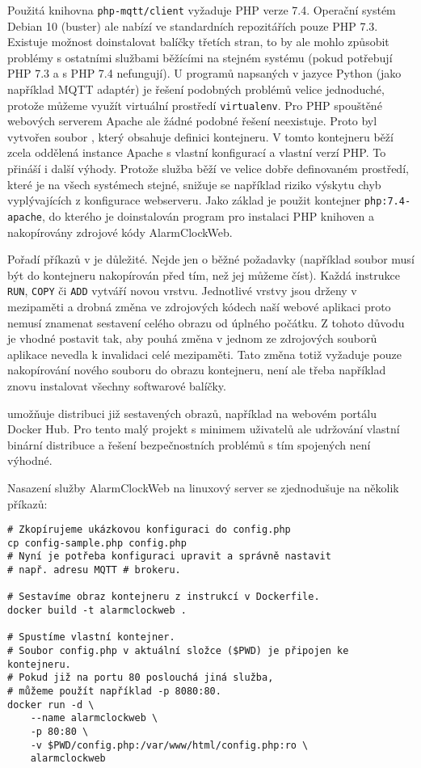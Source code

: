 
Použitá knihovna \texttt{php-mqtt/client} vyžaduje PHP verze 7.4. Operační
systém Debian 10 (buster) ale nabízí ve standardních repozitářích pouze PHP
7.3. Existuje možnost doinstalovat balíčky třetích stran, to by ale mohlo
způsobit problémy s ostatními službami běžícími na stejném systému (pokud
potřebují PHP 7.3 a s PHP 7.4 nefungují).
U programů napsaných v jazyce Python (jako například MQTT adaptér) je řešení
podobných problémů velice jednoduché, protože můžeme využít virtuální prostředí
\texttt{virtualenv}. Pro PHP spouštěné webových serverem Apache ale žádné
podobné řešení neexistuje.
Proto byl vytvořen soubor , který obsahuje definici
kontejneru. V tomto kontejneru běží zcela oddělená instance Apache s vlastní
konfigurací a vlastní verzí PHP. To přináší i další výhody. Protože služba běží
ve velice dobře definovaném prostředí, které je na všech systémech stejné,
snižuje se například riziko výskytu chyb vyplývajících z konfigurace
webserveru. Jako základ je použit kontejner \texttt{php:7.4-apache}, do kterého
je doinstalován program pro instalaci PHP knihoven 
a nakopírovány zdrojové kódy AlarmClockWeb.

Pořadí příkazů v  je důležité. Nejde jen o běžné požadavky
(například soubor musí být do kontejneru nakopírován před tím, než jej můžeme
číst). Každá instrukce \texttt{RUN}, \texttt{COPY} či \texttt{ADD} vytváří
novou vrstvu. Jednotlivé vrstvy jsou drženy v mezipaměti a drobná změna ve
zdrojových kódech naší webové aplikaci proto nemusí znamenat sestavení celého
obrazu od úplného počátku. Z tohoto důvodu je vhodné postavit
 tak, aby pouhá změna v jednom ze zdrojových souborů
aplikace nevedla k invalidaci celé mezipaměti. Tato změna totiž vyžaduje pouze
nakopírování nového souboru do obrazu kontejneru, není ale třeba například
znovu instalovat všechny softwarové balíčky.

 umožňuje distribuci již sestavených obrazů, například na
webovém portálu Docker Hub. Pro tento malý projekt s minimem uživatelů ale
udržování vlastní binární distribuce a řešení bezpečnostních problémů s tím
spojených není výhodné.


Nasazení služby AlarmClockWeb na linuxový server se zjednodušuje na několik
příkazů:
\begin{lstlisting}[language=mybash,style=numbers]
# Zkopírujeme ukázkovou konfiguraci do config.php
cp config-sample.php config.php
# Nyní je potřeba konfiguraci upravit a správně nastavit
# např. adresu MQTT # brokeru.

# Sestavíme obraz kontejneru z instrukcí v Dockerfile.
docker build -t alarmclockweb .

# Spustíme vlastní kontejner.
# Soubor config.php v aktuální složce ($PWD) je připojen ke kontejneru.
# Pokud již na portu 80 poslouchá jiná služba,
# můžeme použít například -p 8080:80.
docker run -d \
    --name alarmclockweb \
    -p 80:80 \
    -v $PWD/config.php:/var/www/html/config.php:ro \
    alarmclockweb
\end{lstlisting}

